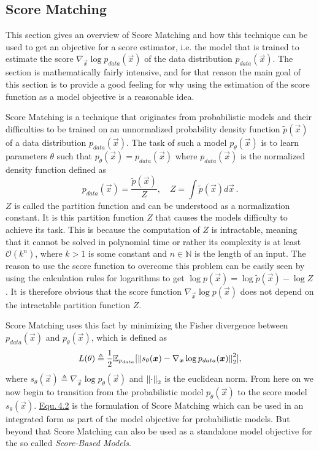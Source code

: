 \subsection{Score Matching} \label{sec:4.1.1}
This section gives an overview of Score Matching and how this technique can be used to get an objective for a score estimator, i.e. the model that is trained to estimate the score $\nabla_{\vec{x}}\log p_{data}(\vec{x})$ of the data distribution $p_{data}(\vec{x})$. The section is mathematically fairly intensive, and for that reason the main goal of this section is to provide a good feeling for why using the estimation of the score function as a model objective is a reasonable idea.

Score Matching \cite{score_matching_original} is a technique that originates from probabilistic models and their difficulties to be trained on an unnormalized probability density function $\tilde{p}(\vec{x})$ of a data distribution $p_{data}(\vec{x})$. The task of such a model $p_\theta(\vec{x})$ is to learn parameters $\theta$ such that $p_\theta(\vec{x})=p_{data}(\vec{x})$ where $p_{data}(\vec{x})$ is the normalized density function defined as
%
\begin{equation}
    p_{data}(\vec{x})=\frac{\tilde{p}(\vec{x})}{Z},\quad Z=\int\tilde{p}(\vec{x})d\vec{x}\,.
\end{equation}
%
$Z$ is called the partition function and can be understood as a normalization constant. It is this partition function $Z$ that causes the models difficulty to achieve its task. This is because the computation of $Z$ is intractable, meaning that it cannot be solved in polynomial time or rather its complexity is at least $\mathcal{O}(k^n)$, where $k>1$ is some constant and $n\in\mathbb{N}$ is the length of an input. The reason to use the score function to overcome this problem can be easily seen by using the calculation rules for logarithms to get $\log p(\vec{x})=\log\tilde{p}(\vec{x})-\log Z$. It is therefore obvious that the score function $\nabla_{\vec{x}}\log p(\vec{x})$ does not depend on the intractable partition function $Z$.

Score Matching uses this fact by minimizing the Fisher divergence between $p_{data}(\vec{x})$ and $p_\theta(\vec{x})$, which is defined as
%
\begin{equation} \label{equ:4.2}
    L(\theta)\triangleq\frac{1}{2}\mathbb{E}_{p_{data}}[\left\lVert s_\theta(\boldsymbol{x})-\nabla_{\boldsymbol{x}}\log p_{data}(\boldsymbol{x})\right\rVert^2_2],
\end{equation}
%
where $s_\theta(\vec{x})\triangleq\nabla_{\vec{x}}\log p_\theta(\vec{x})$ and $\left\lVert\cdot\right\rVert_2$ is the euclidean norm. From here on we now begin to transition from the probabilistic model $p_\theta(\vec{x})$ to the score model $s_\theta(\vec{x})$. \hyperref[equ:4.2]{Equ.\,4.2} is the formulation of Score Matching which can be used in an integrated form as part of the model objective for probabilistic models. But beyond that Score Matching can also be used as a standalone model objective for the so called \textit{Score-Based Models}.

